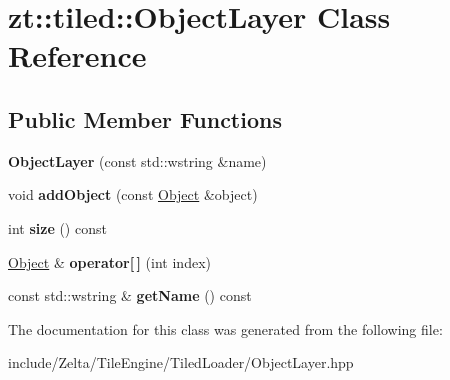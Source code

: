 \hypertarget{classzt_1_1tiled_1_1_object_layer}{}\section{zt\+:\+:tiled\+:\+:Object\+Layer Class Reference}
\label{classzt_1_1tiled_1_1_object_layer}
\subsection*{Public Member Functions}
\begin{DoxyCompactItemize}
\item 
\mbox{\label{classzt_1_1tiled_1_1_object_layer_ae946042ce79a6672304d2bf96b06223a}} 
{\bfseries Object\+Layer} (const std\+::wstring \&name)
\item 
\mbox{\label{classzt_1_1tiled_1_1_object_layer_aa9876d979c17fd3cb87673b87949657f}} 
void {\bfseries add\+Object} (const \hyperlink{classzt_1_1tiled_1_1_object}{Object} \&object)
\item 
\mbox{\label{classzt_1_1tiled_1_1_object_layer_add151e3bd53f59f41189068e2353f3c2}} 
int {\bfseries size} () const
\item 
\mbox{\label{classzt_1_1tiled_1_1_object_layer_a342f9402bce1aa03c51f3a1cae719105}} 
\hyperlink{classzt_1_1tiled_1_1_object}{Object} \& {\bfseries operator\mbox{[}$\,$\mbox{]}} (int index)
\item 
\mbox{\label{classzt_1_1tiled_1_1_object_layer_a2523d73c57790290840a8ad113988188}} 
const std\+::wstring \& {\bfseries get\+Name} () const
\end{DoxyCompactItemize}


The documentation for this class was generated from the following file\+:\begin{DoxyCompactItemize}
\item 
include/\+Zelta/\+Tile\+Engine/\+Tiled\+Loader/Object\+Layer.\+hpp\end{DoxyCompactItemize}
